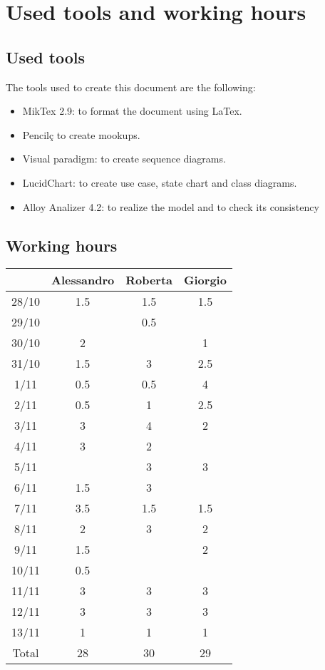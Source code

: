 \chapter{Used tools and working hours}

\section{Used tools}

The tools used to create this document are the following:
\begin{itemize}
\item MikTex 2.9: to format the document using LaTex.
\item Pencilç to create mookups.
\item Visual paradigm: to create sequence diagrams.
\item LucidChart: to create use case, state chart and class diagrams.
\item Alloy Analizer 4.2: to realize the model and to check its consistency
\end{itemize}

\clearpage
\section{Working hours}

\begin{table}[!h]
\begin{tabular}{c|c|c|c}
\centering
      & Alessandro & Roberta & Giorgio \\ \hline
28/10 & 1.5  & 1.5  & 1.5 \\ \hline
29/10 &      & 0.5  &      \\ \hline
30/10 &  2   &      & 1  \\ \hline
31/10 &  1.5 & 3    & 2.5  \\ \hline
1/11  &  0.5 & 0.5  & 4    \\ \hline
2/11  &  0.5 & 1    & 2.5   \\ \hline
3/11  &  3   & 4    & 2    \\ \hline
4/11  &  3   & 2    &      \\ \hline
5/11  &      & 3    & 3  \\ \hline
6/11  &  1.5 & 3    &      \\ \hline
7/11  &  3.5 & 1.5  & 1.5     \\ \hline
8/11  &  2   & 3    & 2   \\ \hline
9/11  &  1.5 &      & 2  \\ \hline
10/11 &  0.5 &      &      \\ \hline
11/11 &  3   & 3    & 3   \\ \hline
12/11 &  3   & 3    & 3   \\ \hline
13/11 &  1   & 1    & 1   \\ \hline
Total & 28   & 30   & 29
\end{tabular}
\end{table}
